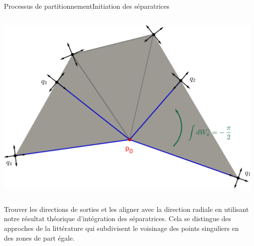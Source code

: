 \documentclass[compress,10pt,aspectratio=169]{beamer}
\begin{document}
\begin{frame}{Processus de partitionnement}{Initiation des séparatrices}
\begin{columns}
\begin{column}{0.4\textwidth}
\centering
\includegraphics[scale=0.3]{images/triangle separatrices bord.png}
\end{column}
\end{columns}
Trouver les directions de sorties et les aligner avec la direction radiale en utilisant notre résultat théorique d'intégration des séparatrices. Cela se distingue des approches de la littérature qui subdivisent le voisinage des points singuliers en des zones de part égale.

\end{frame}
\end{document}

